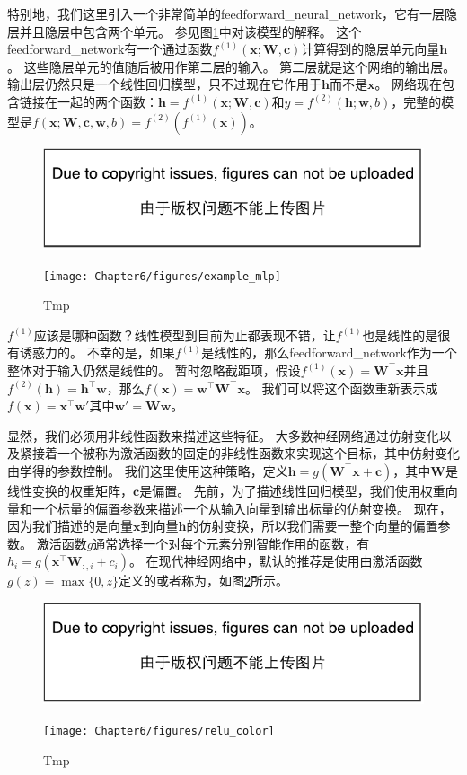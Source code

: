 特别地，我们这里引入一个非常简单的\gls{feedforward_neural_network}，它有一层隐层并且隐层中包含两个单元。
参见图\ref{fig:chap6_example_mlp}中对该模型的解释。
这个\gls{feedforward_network}有一个通过函数$f^{(1)}(\bm{x};\bm{W}, \bm{c})$计算得到的隐层单元向量$\bm{h}$。
这些隐层单元的值随后被用作第二层的输入。
第二层就是这个网络的输出层。
输出层仍然只是一个线性回归模型，只不过现在它作用于$\bm{h}$而不是$\bm{x}$。
网络现在包含链接在一起的两个函数：$\bm{h}=f^{(1)}(\bm{x}; \bm{W}, \bm{c})$和$y = f^{(2)}(\bm{h}; \bm{w}, b)$，完整的模型是$f(\bm{x}; \bm{W}, \bm{c}, \bm{w}, b) = f^{(2)}(f^{(1)}(\bm{x}))$。
\begin{figure}[!htb]
\ifOpenSource
\centerline{\includegraphics{figure.pdf}}
\else
\centerline{\texttt{[image: Chapter6/figures/example\_mlp]}}
\fi
\caption{Tmp}
\label{fig:chap6_example_mlp}
\end{figure}


$f^{(1)}$应该是哪种函数？线性模型到目前为止都表现不错，让$f^{(1)}$也是线性的是很有诱惑力的。
不幸的是，如果$f^{(1)}$是线性的，那么\gls{feedforward_network}作为一个整体对于输入仍然是线性的。
暂时忽略截距项，假设$f^{(1)}(\bm{x})= \bm{W}^\top \bm{x}$并且$f^{(2)}(\bm{h})=\bm{h}^\top \bm{w}$，那么$f(\bm{x}) = \bm{w}^\top\bm{W}^\top \bm{x}$。
我们可以将这个函数重新表示成$f(\bm{x}) = \bm{x}^\top\bm{w}'$其中$\bm{w}' = \bm{W}\bm{w}$。


显然，我们必须用非线性函数来描述这些特征。
大多数神经网络通过仿射变化以及紧接着一个被称为激活函数的固定的非线性函数来实现这个目标，其中仿射变化由学得的参数控制。
我们这里使用这种策略，定义$\bm{h}=g(\bm{W}^\top \bm{x}+\bm{c})$，其中$\bm{W}$是线性变换的权重矩阵，$\bm{c}$是偏置。
先前，为了描述线性回归模型，我们使用权重向量和一个标量的偏置参数来描述一个从输入向量到输出标量的仿射变换。
现在，因为我们描述的是向量$\bm{x}$到向量$\bm{h}$的仿射变换，所以我们需要一整个向量的偏置参数。
激活函数$g$通常选择一个对每个元素分别智能作用的函数，有$h_i =g(\bm{x}^\top \bm{W}_{:, i} + c_i)$。
在现代神经网络中，默认的推荐是使用由激活函数$g(z)=\max\{0, z\}$定义的或者称为\citep{Jarrett-ICCV2009-small,Nair-2010-small,Glorot+al-AI-2011-small}，如图\ref{fig:chap6_relu_color}所示。
\begin{figure}[!htb]
\ifOpenSource
\centerline{\includegraphics{figure.pdf}}
\else
\centerline{\texttt{[image: Chapter6/figures/relu\_color]}}
\fi
\caption{Tmp}
\label{fig:chap6_relu_color}
\end{figure}


